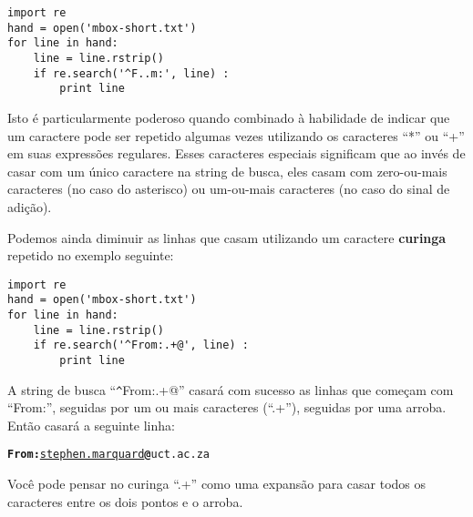 \beforeverb
\begin{verbatim}
import re
hand = open('mbox-short.txt')
for line in hand:
    line = line.rstrip()
    if re.search('^F..m:', line) :
        print line
\end{verbatim}
\afterverb
%

Isto é particularmente poderoso quando combinado à habilidade de indicar que
um caractere pode ser repetido algumas vezes utilizando os caracteres ``*''
ou ``+'' em suas expressões regulares. Esses caracteres especiais significam
que ao invés de casar com um único caractere na string de busca, eles casam
com zero-ou-mais caracteres (no caso do asterisco) ou um-ou-mais caracteres
(no caso do sinal de adição).

Podemos ainda diminuir as linhas que casam utilizando um caractere {\bf curinga}
repetido no exemplo seguinte: 

\beforeverb
\begin{verbatim}
import re
hand = open('mbox-short.txt')
for line in hand:
    line = line.rstrip()
    if re.search('^From:.+@', line) :
        print line
\end{verbatim}
\afterverb
%

A string de busca ``\verb"^"From:.+@'' casará com sucesso as linhas que
começam com ``From:'', seguidas por um ou mais caracteres (``.+''), seguidas
por uma arroba. Então casará a seguinte linha:

\beforeverb
\begin{alltt}
{\bf From:}\underline{ stephen.marquard}{\bf @}uct.ac.za
\end{alltt}
\afterverb

Você pode pensar no curinga ``.+'' como uma expansão para casar todos os
caracteres entre os dois pontos e o arroba. 

